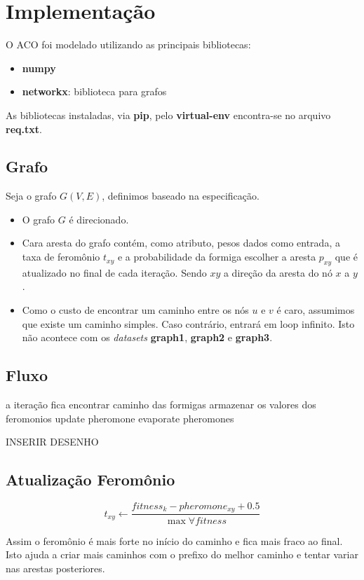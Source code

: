 \section{Implementação}

O ACO foi modelado utilizando as principais bibliotecas:

\begin{itemize}
	\item \textbf{numpy}
	\item \textbf{networkx}: biblioteca para grafos
\end{itemize}

As bibliotecas instaladas, via \textbf{pip}, pelo \textbf{virtual-env} encontra-se
no arquivo \textbf{req.txt}.

\subsection{Grafo}

Seja o grafo $G(V, E)$, definimos baseado na especificação.

\begin{itemize}
	\item O grafo $G$ é direcionado.
	\item Cara aresta do grafo contém, como atributo, pesos dados como entrada, a taxa de feromônio $t_{xy}$ e a probabilidade
	da formiga escolher a aresta $p_{xy}$ que é atualizado no final de cada iteração. Sendo $xy$ a direção da aresta do nó $x$ a $y$.
	\item Como o custo de encontrar um caminho entre os nós $u$ e $v$ é caro, assumimos que existe um caminho simples. Caso contrário,
	entrará em loop infinito. Isto não acontece com os \textit{datasets} \textbf{graph1}, \textbf{graph2} e \textbf{graph3}.
\end{itemize}

\subsection{Fluxo}

a iteração fica  
encontrar caminho das formigas  
armazenar os valores dos feromonios  
update pheromone  
evaporate pheromones  

INSERIR DESENHO

\subsection{Atualização Feromônio}




$$t_{xy} \leftarrow \frac{fitness_k - pheromone_{xy} + 0.5}{\max \forall fitness}$$

Assim o feromônio é mais forte no início do caminho e fica mais fraco ao final. Isto ajuda
a criar mais caminhos com o prefixo do melhor caminho e tentar variar nas arestas posteriores.
